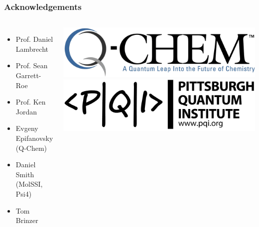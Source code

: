 \documentclass{beamer}
\begin{document}
\begin{frame}
  \frametitle{Acknowledgements}
  \begin{columns}
    \begin{minipage}{1.0\linewidth}
      \begin{itemize}
      \item Prof. Daniel Lambrecht
      \item Prof. Sean Garrett-Roe
      \item Prof. Ken Jordan
      \item Evgeny Epifanovsky (Q-Chem)
      \item Daniel Smith (MolSSI, Psi4)
      \item Tom Brinzer
      \end{itemize}
    \end{minipage}
    \begin{minipage}{1.0\linewidth}
      \centering
      \includegraphics[width=1.00\linewidth,keepaspectratio]{./figures/Qchem-logo.png}
      \includegraphics[width=0.90\linewidth,keepaspectratio]{./figures/PQI-Letter-Logo-black.png}

\end{minipage}
\end{columns}
\end{frame}
\end{document}
